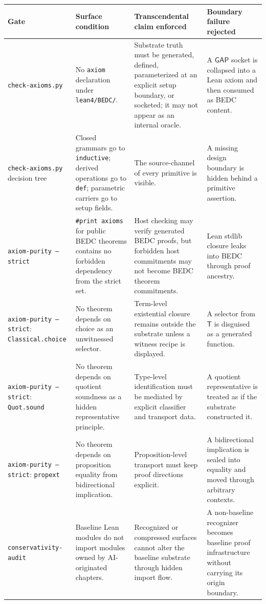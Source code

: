 \begin{longtable}{p{}p{}p{}p{}}
\toprule
\textbf{Gate} & \textbf{Surface condition} & \textbf{Transcendental claim enforced} & \textbf{Boundary failure rejected} \\
\midrule
\texttt{check-axioms.py} & No \texttt{axiom} declaration under \texttt{lean4/BEDC/}. & Substrate truth must be generated, defined, parameterized at an explicit setup boundary, or socketed; it may not appear as an internal oracle. & A $\mathsf{GAP}$ socket is collapsed into a Lean axiom and then consumed as BEDC content. \\
\texttt{check-axioms.py} decision tree & Closed grammars go to \texttt{inductive}; derived operations go to \texttt{def}; parametric carriers go to setup fields. & The source-channel of every primitive is visible. & A missing design boundary is hidden behind a primitive assertion. \\
\texttt{axiom-purity --strict} & \texttt{\#print axioms} for public BEDC theorems contains no forbidden dependency from the strict set. & Host checking may verify generated BEDC proofs, but forbidden host commitments may not become BEDC theorem commitments. & Lean stdlib closure leaks into BEDC through proof ancestry. \\
\texttt{axiom-purity --strict}: \texttt{Classical.choice} & No theorem depends on choice as an unwitnessed selector. & Term-level existential closure remains outside the substrate unless a witness recipe is displayed. & A selector from $\mathsf{T}$ is disguised as a generated function. \\
\texttt{axiom-purity --strict}: \texttt{Quot.sound} & No theorem depends on quotient soundness as a hidden representative principle. & Type-level identification must be mediated by explicit classifier and transport data. & A quotient representative is treated as if the substrate constructed it. \\
\texttt{axiom-purity --strict}: \texttt{propext} & No theorem depends on proposition equality from bidirectional implication. & Proposition-level transport must keep proof directions explicit. & A bidirectional implication is sealed into equality and moved through arbitrary contexts. \\
\texttt{conservativity-audit} & Baseline Lean modules do not import modules owned by AI-originated chapters. & Recognized or compressed surfaces cannot alter the baseline substrate through hidden import flow. & A non-baseline recognizer becomes baseline proof infrastructure without carrying its origin boundary. \\

\end{longtable}
